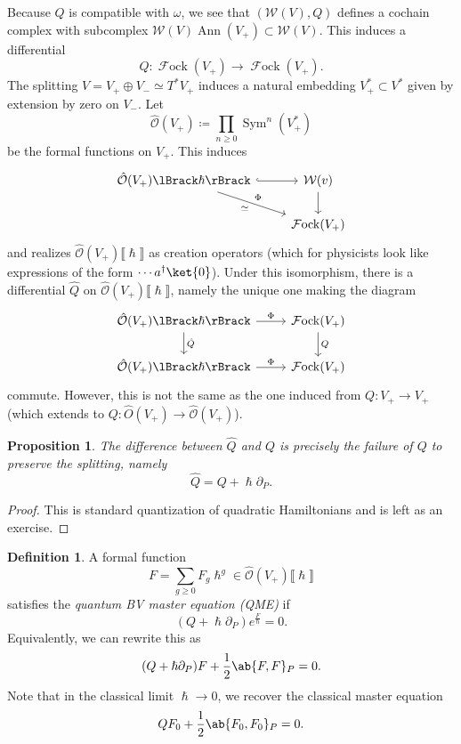 \documentclass[article,10pt,oneside,oldfontcommands]{memoir}
\newtheorem{prop}[thm]{Proposition}
\theoremstyle{definition}
\newtheorem{defn}[thm]{Definition}
\theoremstyle{remark}
\theoremstyle{plain}
\theoremstyle{definition}
\theoremstyle{remark}
\newcommand{\mc}[1]{\mathcal{#1}}
\newcommand{\on}[1]{\operatorname{#1}}
\newcommand{\1}{\mathbf{1}}
\newcommand{\2}{\mathbf{2}}
\newcommand{\3}{\mathbf{3}}
\newcommand{\ps}[1]{\lBrack #1 \rBrack}
\DeclareMathOperator{\Sym}{Sym}
\DeclareMathOperator{\Fock}{\mc{F}ock}
\begin{document}
Because \(Q\) is compatible with \(\omega\), we see that \((\mc{W}(V), Q)\) defines a cochain complex with subcomplex \(\mc{W}(V) \on{Ann}(V_+) \subset \mc{W}(V)\). This induces a differential
\[ Q \colon \Fock(V_+) \to \Fock(V_+). \]
The splitting \(V = V_+ \oplus V_- \simeq T^* V_+\) induces a natural embedding \(V_+^* \subset V^*\) given by extension by zero on \(V_-\). Let
\[ \hat{\mc{O}}(V_+) \coloneqq \prod_{n \geq 0} \Sym^n (V_+^*) \]
be the formal functions on \(V_+\). This induces
\begin{equation*}
\begin{tikzcd}
    \hat{\mc{O}}(V_+)\ps{\hslash} \ar[hookrightarrow]{r} \ar{dr}{\Phi}[swap]{\simeq} & \mc{W}(v) \ar{d} \\
    & \Fock(V_+)
\end{tikzcd}
\end{equation*}
and realizes \(\hat{\mc{O}}(V_+) \ps{\hslash}\) as creation operators (which for physicists look like expressions of the form \(\cdots a^{\dagger} \ket{0}\)). Under this isomorphism, there is a differential \(\hat{Q}\) on \(\hat{\mc{O}}(V_+) \ps{\hslash}\), namely the unique one making the diagram
\begin{equation*}
\begin{tikzcd}
    \hat{\mc{O}}(V_+) \ps{\hslash} \ar{r}{\Phi} \ar{d}{\hat{Q}} & \Fock(V_+) \ar{d}{Q} \\
    \hat{\mc{O}}(V_+) \ps{\hslash} \ar{r}{\Phi} & \Fock(V_+)
\end{tikzcd}
\end{equation*}
commute. However, this is not the same as the one induced from \(Q \colon V_+ \to V_+\) (which extends to \(Q \colon \hat{O}(V_+) \to \hat{\mc{O}}(V_+)\)).

\begin{prop}
    The difference between \(\hat{Q}\) and \(Q\) is precisely the failure of \(Q\) to preserve the splitting, namely
    \[ \hat{Q} = Q + \hslash \partial_P. \]
\end{prop}

\begin{proof}
    This is standard quantization of quadratic Hamiltonians and is left as an exercise.
\end{proof}

\begin{defn}
    A formal function
    \[ F = \sum_{g \geq 0} F_g \hslash^g \in \hat{\mc{O}}(V_+) \ps{\hslash} \]
    satisfies the \textit{quantum BV master equation (QME)} if
    \[ (Q + \hslash \partial_P) e^{\frac{F}{\hslash}} = 0. \]
    Equivalently, we can rewrite this as
    \[ (Q + \hslash \partial_P) F + \frac{1}{2} \ab\{ F, F \}_P = 0. \]
    Note that in the classical limit \(\hslash \to 0\), we recover the classical master equation
    \[ Q F_0 + \frac{1}{2} \ab\{ F_0, F_0 \}_P = 0. \]
\end{defn}
\end{document}
